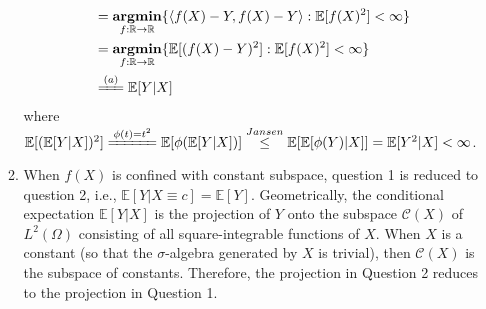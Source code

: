 \documentclass[11pt,letter,notitlepage]{article}
\DeclareMathOperator*{\argmin}{\bf argmin}
\begin{document}
\begin{solution}
\begin{enumerate}
\begin{enumerate}
\begin{align*}
        &=
        \argmin_{f:\mathbb{R} \to \mathbb{R}}\{\langle f(X) - Y, f(X) - Y \rangle: \mathbb{E}[f(X)^2] < \infty\}\\
        &=
        \argmin_{f:\mathbb{R} \to \mathbb{R}}\{\mathbb{E}[(f(X) - Y)^2]: \mathbb{E}[f(X)^2] < \infty\}\\
        &\xlongequal{(a)}
        \mathbb{E}[Y|X]
        \end{align*}
        where $\mathbb{E}[(\mathbb{E}[Y|X])^2] \xlongequal{\phi(t) = t^2} \mathbb{E}[\phi(\mathbb{E}[Y|X])] \overset{Jansen}{\leq} \mathbb{E}[\mathbb{E}[\phi(Y)|X]] = \mathbb{E}[Y^2|X] < \infty$.
        \item
        When $f(X)$ is confined with constant subspace, question 1 is reduced to question 2, i.e., $\mathbb{E}[Y|X \equiv c] = \mathbb{E}[Y]$. Geometrically, the conditional expectation $\mathbb{E}[Y|X]$ is the projection of $Y$ onto the subspace $\mathcal{C}(X)$ of $L^2(\Omega)$ consisting of all square-integrable functions of $X$. When $X$ is a constant (so that the $\sigma$-algebra generated by $X$ is trivial), then $\mathcal{C}(X)$ is the subspace of constants. Therefore, the projection in Question 2 reduces to the projection in Question 1.
    \end{enumerate}
\end{enumerate}
\end{solution}
	
\end{document}
